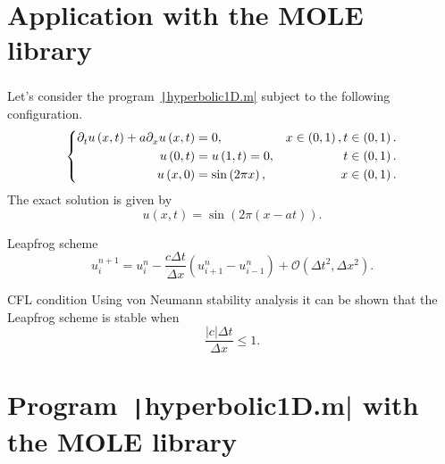 \section{Application with the MOLE library}

\begin{frame}
	\frametitle{\secname}
	\begin{example}[Homogeneous]
		Let's consider the program~\href{https://raw.githubusercontent.com/carlosal1015/mole_examples/main/examples/octave/hyperbolic1D.m}{\texttt|hyperbolic1D.m|} subject to the following configuration.
		\begin{equation*}
			\left\{
			\begin{aligned}
				\difcp{u}{t}\left(x,t\right)+
				a\difcp{u}{x}\left(x,t\right) & =
				0,                            & x\in\left(0,1\right), t\in\left(0,1\right). \\
				u\left(0,t\right)             & =
				u\left(1,t\right)=0,          & t\in\left(0,1\right).                       \\
				u\left(x,0\right)             & =
				\sin\left(2\pi x\right),      & x\in\left(0,1\right).
			\end{aligned}
			\right.
		\end{equation*}
		The exact solution is given by
		\begin{equation*}
			u\left(x,t\right)=
			\sin
			\left(2\pi\left(x-at\right)\right).
		\end{equation*}
	\end{example}

	\begin{block}{Leapfrog scheme}
		\begin{equation*}
			u^{n+1}_{i}=
			u^{n}_{i}-
			\frac{c\Delta t}{\Delta x}
			\left(u^{n}_{i+1}-u^{n}_{i-1}\right)+
			\mathcal{O}\left(\Delta t^{2},\Delta x^{2}\right).
		\end{equation*}
	\end{block}

	\begin{alertblock}{CFL condition}
		Using von Neumann stability analysis it can be shown that the
		Leapfrog scheme is stable when
		\begin{equation*}
			\frac{\left|c\right|\Delta t}{\Delta x}\leq 1.
		\end{equation*}
	\end{alertblock}
\end{frame}

\section{Program~\texttt|hyperbolic1D.m| with the MOLE library}

